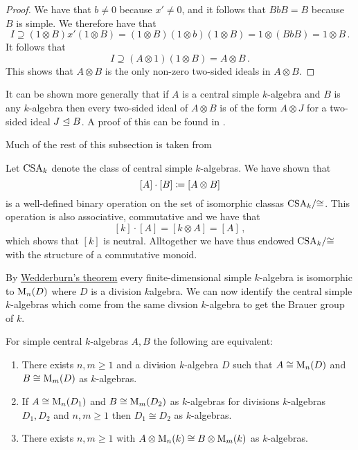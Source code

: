 \begin{proof}
  We have that $b \neq 0$ because $x' \neq 0$, and it follows that $BbB = B$ because $B$ is simple.
  We therefore have that
  \[
              I
    \supseteq (1 \otimes B) x' (1 \otimes B)
    =         (1 \otimes B) (1 \otimes b) (1 \otimes B)
    =         1 \otimes (BbB)
    =         1 \otimes B \,.
  \]
  It follows that
  \[
              I
    \supseteq (A \otimes 1) (1 \otimes B)
    =         A \otimes B \,.
  \]
  This shows that $A \otimes B$ is the only non-zero two-sided ideals in $A \otimes B$.
\end{proof}


\begin{remark}
  It can be shown more generally that if $A$ is a central simple $k$-algebra and $B$ is any $k$-algebra then every two-sided ideal of $A \otimes B$ is of the form $A \otimes J$ for a two-sided ideal $J \trianglelefteq B$.
  A proof of this can be found in \cite[Lemma~4.1]{Clark2012NonCA}.
\end{remark}


\begin{fluff}
  Much of the rest of this subsection is taken from \cite[4.2]{Clark2012NonCA}
\end{fluff}


\begin{fluff}
  Let $\operatorname{CSA}_k$ denote the class of central simple $k$-algebras.
  We have shown that
  \[
              [A] \cdot [B]
    \coloneqq  [A \otimes B]
  \]
  is a well-defined binary operation on the set of isomorphic classas $\operatorname{CSA}_k\!/{\cong}$.
  This operation is also associative, commutative and we have that
  \[
      [k] \cdot [A]
    = [k \otimes A]
    = [A] \,,
  \]
  which shows that $[k]$ is neutral.
  Alltogether we have thus endowed $\operatorname{CSA}_k\!/{\cong}$ with the structure of a commutative monoid.
  
  By \hyperref[theorem: wedderburns theorem]{Wedderburn’s theorem} every finite-dimensional simple $k$-algebra is isomorphic to $\operatorname{M}_n(D)$ where $D$ is a division $k$algebra.
  We can now identify the central simple $k$-algebras which come from the same divsion $k$-algebra to get the Brauer group of $k$.
\end{fluff}


\begin{lemma}
  \label{lemma: characterization of Brauer equivalence}
  For simple central $k$-algebras $A, B$ the following are equivalent:
  \begin{enumerate}
    \item
      There exists $n, m \geq 1$ and a division $k$-algebra $D$ such that $A \cong \operatorname{M}_n(D)$ and $B \cong \operatorname{M}_m(D)$ as $k$-algebras.
    \item
      If $A \cong \operatorname{M}_n(D_1)$ and $B \cong \operatorname{M}_m(D_2)$ as $k$-algebras for divisions $k$-algebras $D_1, D_2$ and $n, m \geq 1$ then $D_1 \cong D_2$ as $k$-algebras.
    \item
      There exists $n, m \geq 1$ with $A \otimes \operatorname{M}_n(k) \cong B \otimes \operatorname{M}_m(k)$ as $k$-algebras.
  \end{enumerate}
\end{lemma}


